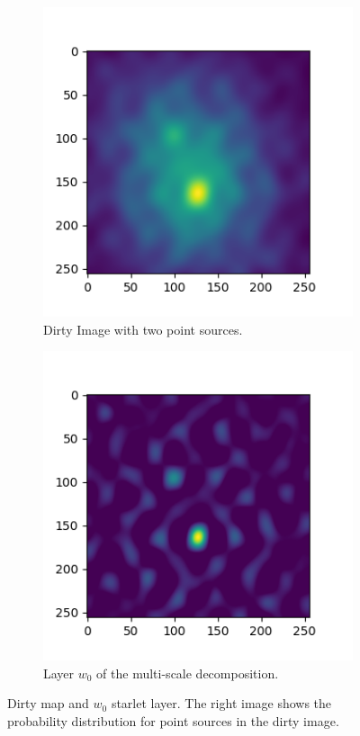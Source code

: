 \begin{figure}[h]
	\centering
	\begin{subfigure}[b]{0.45\linewidth}
		\includegraphics[width=\linewidth]{./chapters/05.algorithms/sim02/sim02_point_dirty.png}
		\caption{Dirty Image with two point sources.}
		\label{cd:heuristic:dirty}
	\end{subfigure}
	\begin{subfigure}[b]{0.45\linewidth}
		\includegraphics[width=\linewidth]{./chapters/05.algorithms/sim02/starlets0.png}
		\caption{Layer $w_0$ of the multi-scale decomposition.}
		\label{cd:heuristic:starlet}
	\end{subfigure}
	\caption{Dirty map and $w_0$ starlet layer. The right image shows the probability distribution for point sources in the dirty image.}
	\label{cd:heuristic:figure}
\end{figure}

